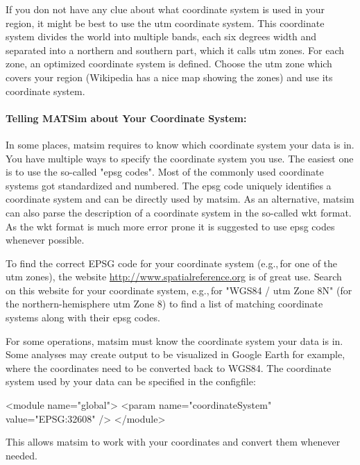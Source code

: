 If you don not have any clue about what coordinate system is used in your region, it might be best to use the \gls{utm} coordinate system. This coordinate system divides the world into multiple bands, each six degrees width and separated into a northern and southern part, which it calls \gls{utm} zones. For each zone, an optimized coordinate system is defined. Choose the \gls{utm} zone which covers your region (Wikipedia has a nice map showing the zones) and use its coordinate system. 

\paragraph{Telling MATSim about Your Coordinate System:}
In some places, \gls{matsim} requires to know which coordinate system your data is in. You have multiple ways to specify the coordinate system you use. The easiest one is to use the so-called "\gls{epsg} codes". Most of the commonly used coordinate systems got standardized and numbered. The \gls{epsg} code uniquely identifies a coordinate system and can be directly used by \gls{matsim}. As an alternative, \gls{matsim} can also parse the description of a coordinate system in the so-called \gls{wkt} format. As the \gls{wkt} format is much more error prone it is suggested to use \gls{epsg} codes whenever possible.

To find the correct EPSG code for your coordinate system (e.g.,\,for one of the \gls{utm} zones), the website \url{http://www.spatialreference.org} is of great use. Search on this website for your coordinate system, e.g.,\,for "WGS84 / \gls{utm} Zone 8N" (for the northern-hemisphere \gls{utm} Zone 8) to find a list of matching coordinate systems along with their \gls{epsg} codes.

For some operations, \gls{matsim} must know the coordinate system your data is in. Some analyses may create output to be visualized in Google Earth for example, where the coordinates need to be converted back to WGS84. The coordinate system used by your data can be specified in the \gls{configfile}:

\begin{xml}
<module name="global"> 
  <param name="coordinateSystem" value="EPSG:32608" /> 
</module>
\end{xml}

This allows \gls{matsim} to work with your coordinates and convert them whenever needed. 

